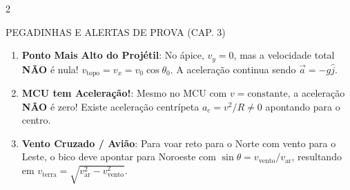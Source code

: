 \documentclass[9pt,a4paper]{article}
\begin{document}
\begin{multicols*}{2}
\begin{alertbox}{PEGADINHAS E ALERTAS DE PROVA (CAP. 3)}
\begin{enumerate}[leftmargin=*,itemsep=1pt]
    \item \textbf{Ponto Mais Alto do Projétil}: No ápice, $v_y = 0$, mas a velocidade total \textbf{NÃO} é nula! $v_{\text{topo}} = v_x = v_0 \cos\theta_0$. A aceleração continua sendo $\vec{a} = -g\hat{j}$.
    \item \textbf{MCU tem Aceleração!}: Mesmo no MCU com $v = \text{constante}$, a aceleração \textbf{NÃO} é zero! Existe aceleração centrípeta $a_c = v^2/R \neq 0$ apontando para o centro.
    \item \textbf{Vento Cruzado / Avião}: Para voar reto para o Norte com vento para o Leste, o bico deve apontar para Noroeste com $\sin\theta = v_{\text{vento}} / v_{\text{ar}}$, resultando em $v_{\text{terra}} = \sqrt{v_{\text{ar}}^2 - v_{\text{vento}}^2}$.
\end{enumerate}
\end{alertbox}

\end{multicols*}
\end{document}
